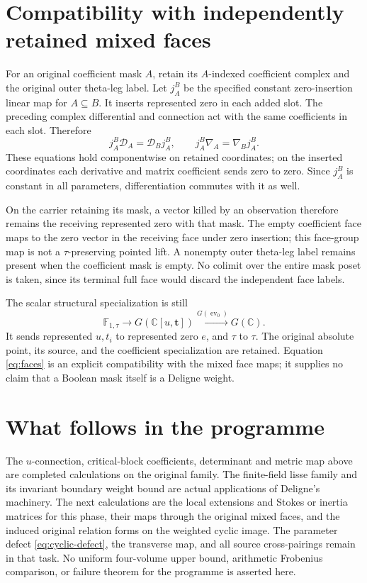 \documentclass[11pt]{article}
\newcommand{\C}{\mathbb C}
\begin{document}
\section{Compatibility with independently retained mixed faces}

For an original coefficient mask $A$, retain its $A$-indexed coefficient
complex and the original outer theta-leg label.  Let
$j_A^B$ be the specified constant zero-insertion linear map for
$A\subseteq B$.  It inserts represented zero in each added slot.
The preceding complex differential and connection act with the same
coefficients in each slot.  Therefore
\begin{equation}
 j_A^B\mathcal D_A=\mathcal D_Bj_A^B,
 \qquad j_A^B\nabla_A=\nabla_Bj_A^B.
 \label{eq:faces}
\end{equation}
These equations hold componentwise on retained coordinates; on the
inserted coordinates each derivative and matrix coefficient sends zero
to zero.  Since $j_A^B$ is constant in all parameters, differentiation
commutes with it as well.

On the carrier retaining its mask, a vector killed by an observation
therefore remains the receiving represented zero with that mask.
The empty coefficient face maps to the zero vector in the receiving
face under zero insertion; this face-group map is not a
$\tau$-preserving pointed lift.  A nonempty outer theta-leg label
remains present when the coefficient mask is empty.  No colimit over
the entire mask poset is taken, since its terminal full face would
discard the independent face labels.

The scalar structural specialization is still
\[
 \mathbb F_{1,\tau}\longrightarrow G(\C[u,\mathbf t])
       \xrightarrow{G(\operatorname{ev}_0)}G(\C).
\]
It sends represented $u,t_i$ to represented zero $e$, and $\tau$ to
$\tau$.  The original absolute point, its source, and the coefficient
specialization are retained.  Equation \eqref{eq:faces} is an explicit
compatibility with the mixed face maps; it supplies no claim that a
Boolean mask itself is a Deligne weight.

\section{What follows in the programme}

The $u$-connection, critical-block coefficients, determinant and metric
map above are completed calculations on the original family.  The
finite-field lisse family and its invariant boundary weight bound are
actual applications of Deligne's machinery.  The next calculations
are the local extensions and Stokes or inertia matrices for this phase,
their maps through the original mixed faces, and the induced original
relation forms on the weighted cyclic image.  The parameter defect
\eqref{eq:cyclic-defect}, the transverse map, and all source
cross-pairings remain in that task.  No uniform four-volume upper bound,
arithmetic Frobenius comparison, or failure theorem for the programme
is asserted here.
\end{document}
